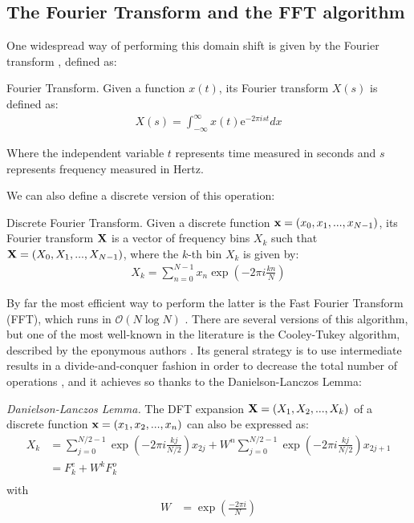 \documentclass[../main.tex]{subfiles} \label{chapter_soa}
\begin{document}
\subsection{The Fourier Transform and the FFT algorithm} \label{subsection_fft}
\par One widespread way of performing this domain shift is given by the Fourier transform \cite{Weisstein2015}, defined as:
\theoremstyle{definition}
\begin{definition}{Fourier Transform}.
Given a function $x(t)$, its Fourier transform $X(s)$ is defined as:
\begin{align*}
X(s) = \int_{-\infty}^{\infty}x(t)\mathrm{e}^{-2\pi ist}dx
\end{align*}
\par Where the independent variable $t$ represents time measured in seconds and $s$ represents frequency measured in Hertz.
\end{definition}
\par We can also define a discrete version of this operation:
\begin{definition}{Discrete Fourier Transform}.
Given a discrete function $\mathbf{x} = (x_0,x_1,...,x_{N-1})$, its Fourier transform $\mathbf{X}$ is a vector of frequency bins $X_k$ such that $\mathbf{X} = (X_0, X_1,...,X_{N-1})$, where the $k$-th bin $X_k$ is given by:
\begin{align*}
X_k = \sum_{n=0}^{N-1}x_{n}\exp{\left(-2\pi i\frac{kn}{N}\right)}
\end{align*}
\end{definition}
\par By far the most efficient way to perform the latter is the Fast Fourier Transform (FFT), which runs in $\mathcal{O}(N\log{N})$ \cite{Smith2011}. There are several versions of this algorithm, but one of the most well-known in the literature is the Cooley-Tukey algorithm, described by the eponymous authors \cite{Cooley1965,Weisstein2015}. Its general strategy is to use intermediate results in a divide-and-conquer fashion in order to decrease the total number of operations \cite{Weisstein2015}, and it achieves so thanks to the Danielson-Lanczos Lemma:
\begin{lemma}
\emph{Danielson-Lanczos Lemma.} The DFT expansion $\mathbf{X} = (X_1, X_2,...,X_k)$ of a discrete function $\mathbf{x} = (x_1,x_2,...,x_n)$ can also be expressed as:\\
\begin{align*}
X_k &= \sum_{j=0}^{N/2-1}\exp{\left(-2\pi i\frac{kj}{N/2}\right)}x_{2j} + W^n\sum_{j=0}^{N/2-1}\exp{\left(-2\pi i\frac{kj}{N/2}\right)}x_{2j+1}\\
&=F^e_k + W^kF^o_k \\
\end{align*}
with
\begin{align*}
W &= \exp{\left(\frac{-2\pi i}{N}\right)}
\end{align*}
\end{lemma}
\end{document}
